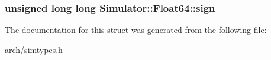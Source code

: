 \hypertarget{struct_simulator_1_1_float64_a1253dc02adb9798a2b0ea1a5c9d5ba44}{
\subsubsection[{sign}]{\setlength{\rightskip}{0pt plus 5cm}unsigned long long Simulator\+::\+Float64\+::sign}}\label{struct_simulator_1_1_float64_a1253dc02adb9798a2b0ea1a5c9d5ba44}


The documentation for this struct was generated from the following file\+:\begin{DoxyCompactItemize}
\item 
arch/\hyperlink{simtypes_8h}{simtypes.\+h}\end{DoxyCompactItemize}
